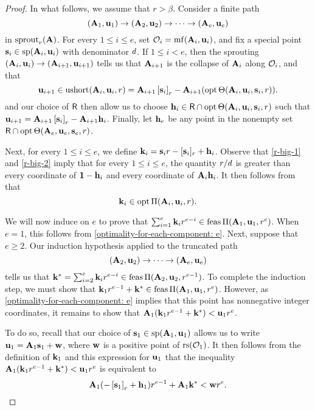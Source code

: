 \documentclass{article}
\begin{document}
\begin{proof}
    In what follows, we assume that $r > \beta$.
    Consider a finite path
    \[ (\mathbf{A}_1, \mathbf{u}_1) \to (\mathbf{A}_2, \mathbf{u}_2) \to \cdots \to (\mathbf{A}_e, \mathbf{u}_e) \]
    in $\operatorname{sprout}_r(\mathbf{A})$.
    For every $1 \leq i \leq e$, set $\mathcal{O}_i = \operatorname{mf}(\mathbf{A}_i, \mathbf{u}_i)$, and fix a special point $\mathbf{s}_i \in \operatorname{sp}(\mathbf{A}_i, \mathbf{u}_i)$ with denominator $d$.
    If $1 \leq i < e$, then the sprouting $(\mathbf{A}_i, \mathbf{u}_i) \to (\mathbf{A}_{i+1}, \mathbf{u}_{i+1})$ tells us that $\mathbf{A}_{i+1}$ is the collapse of $\mathbf{A}_i$ along $\mathcal{O}_i$, and that
    \[
       \mathbf{u}_{i+1} \in \operatorname{ushort}(\mathbf{A}_i, \mathbf{u}_i, r)= \mathbf{A}_{i+1} \left[ \mathbf{s}_i \right]_r - \mathbf{A}_{i+1}(\operatorname{opt} \Theta( \mathbf{A}_i, \mathbf{u}_i, \mathbf{s}_i, r)).
    \]
     and our choice of $\mathsf{R}$ then allow us to choose $\mathbf{h}_i \in \mathsf{R} \cap \operatorname{opt} \Theta ( \mathbf{A}_i, \mathbf{u}_i, \mathbf{s}_i, r)$ such that $\mathbf{u}_{i+1} = \mathbf{A}_{i+1} \left[ \mathbf{s}_i \right]_r - \mathbf{A}_{i+1} \mathbf{h}_i$.
    Finally, let $\mathbf{h}_e$ be any point in the nonempty set $\mathsf{R} \cap \operatorname{opt} \Theta ( \mathbf{A}_e, \mathbf{u}_e, \mathbf{s}_e, r)$.

    Next, for every $1 \leq i \leq e$,  we define $\mathbf{k}_i = \mathbf{s}_i r - [\mathbf{s}_i]_r + \mathbf{h}_i$.
    Observe that \eqref{r-big-1} and \eqref{r-big-2} imply that for every $1 \leq i \leq e$, the quantity $r/d$ is greater than every coordinate of $\mathbf{1}-\mathbf{h}_i$ and every coordinate of $\mathbf{A}_i \mathbf{h}_i$.
    It then follows from  that
    \begin{equation}
       \label{optimality-for-each-component: e}
       \mathbf{k}_i \in \operatorname{opt} \Pi(\mathbf{A}_i, \mathbf{u}_i,r).
    \end{equation}

    We will now induce on $e$ to prove that $\sum_{i=1}^e \mathbf{k}_i r^{e-i} \in \operatorname{feas}\Pi(\mathbf{A}_1, \mathbf{u}_1, r^e)$.
    When $e = 1$, this follows from \eqref{optimality-for-each-component: e}.
    Next, suppose that $e \geq 2$.
    Our induction hypothesis applied to the truncated path
    \[ (\mathbf{A}_2, \mathbf{u}_2) \to \cdots \to (\mathbf{A}_e, \mathbf{u}_e) \]
    tells us that $\mathbf{k}^{\ast} = \sum_{i=2}^e \mathbf{k}_i r^{e-i} \in \operatorname{feas} \Pi(\mathbf{A}_2, \mathbf{u}_2, r^{e-1})$.
    To complete the induction step, we must show that $\mathbf{k}_1 r^{e-1} + \mathbf{k}^{\ast} \in \operatorname{feas}\Pi(\mathbf{A}_1, \mathbf{u}_1, r^e)$.
    However, as \eqref{optimality-for-each-component: e} implies that this point has nonnegative integer coordinates, it remains to show that $\mathbf{A}_1 ( \mathbf{k}_1 r^{e-1} + \mathbf{k}^{\ast} ) < \mathbf{u}_1 r^e$.

    To do so, recall that our choice of $\mathbf{s}_1 \in \operatorname{sp}(\mathbf{A}_1, \mathbf{u}_1)$ allows us to write $\mathbf{u}_1 = \mathbf{A}_1 \mathbf{s}_1 + \mathbf{w}$, where $\mathbf{w}$ is a positive point of $\operatorname{rs}(\mathcal{O}_1)$.
    It then follows from the definition of $\mathbf{k}_1$ and this expression for $\mathbf{u}_1$ that the inequality $\mathbf{A}_1 ( \mathbf{k}_1 r^{e-1} + \mathbf{k}^{\ast} ) < \mathbf{u}_1 r^e$ is equivalent to
    \begin{equation}
       \label{target-inequality: e}
       \mathbf{A}_1( - \left[ \mathbf{s}_1 \right]_r + \mathbf{h}_1 ) r^{e-1} + \mathbf{A}_1\mathbf{k}^{\ast} < \mathbf{w} r^e.
    \end{equation}


\end{proof}
\end{document}

